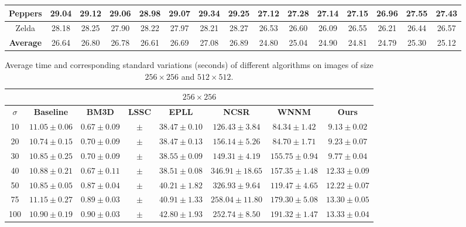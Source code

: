\documentclass[10pt,twocolumn,letterpaper]{article}
\begin{document}
\begin{table*}[t]
\begin{center}
\begin{tabular}{|c||c|c|c|c|c|c|c||c|c|c|c|c|c|c|}
\\
\hline
 Peppers &29.04 & 29.12 & 29.06 & 28.98 & 29.07 & 29.34 & 29.25      &27.12& 27.28 & 27.14 &  27.15 & 26.96 &  27.55  &  27.43
\\
\hline
 Zelda & 28.18 & 28.25 & 27.90 & 28.22 & 27.97 & 28.21 & 28.27      &26.53  &  26.60 & 26.09 &  26.55  & 26.21  & 26.44 & 26.57
\\
\hline
 \textbf{Average} & 26.64 &  26.80 &  26.78 &  26.61  & 26.69  & 27.08 & 26.89     &24.80 &  25.04 & 24.90  &  24.81 & 24.79 & 25.30 & 25.12     
\\
\hline
\end{tabular}
\end{center}
\end{table*}
\begin{table*}[t]\label{tab1}
\caption{Average time and corresponding standard variations (seconds) of  different algorithms on images of size $256\times 256$ and $512\times 512$.}
\begin{center}
\renewcommand\arraystretch{1}
\scriptsize
\begin{tabular}{|c||c|c|c|c|c|c|c|}
\hline
&\multicolumn{7}{c|}{ $256 \times 256$}
\\
\hline
\hline
$\sigma$&\textbf{Baseline} &\textbf{BM3D}&\textbf{LSSC}&\textbf{EPLL}&\textbf{NCSR}&\textbf{WNNM}&\textbf{Ours} 
\\
\hline
  10 &$11.05\pm0.06$  & $0.67\pm 0.09$  &   $  \pm $  & $38.47\pm0.10 $   & $126.43\pm3.84$   & $84.34\pm1.42$   &   $9.13\pm0.02$  
\\
\hline
  20 &$10.74\pm0.15$ &  $0.70\pm0.09$  & $  \pm $   & $38.47\pm0.13$   &  $156.14\pm5.26$  &  $84.70\pm1.71$  &  $9.23\pm 0.07$             
\\
\hline 
 30 &$10.85\pm0.25$   &  $0.70 \pm 0.09$  &  $  \pm $  & $38.55\pm0.09$  &  $149.31\pm4.19$  &  $155.75\pm0.94$  &  $9.77\pm0.04$            
\\
\hline
 40&$10.88\pm0.21$   &  $0.67\pm0.11$  &  $  \pm $  &  $38.51\pm0.08$  &  $346.91\pm18.65$  &  $157.35\pm1.48$  & $12.33\pm0.09$            
\\
\hline
 50&$10.85\pm0.05$   &  $0.87\pm0.04$  &  $  \pm $  &  $40.21\pm1.82 $  &  $326.93\pm9.64$  & $119.47\pm4.65$   &  $12.22\pm0.07$     
\\
\hline
 75 &$11.15\pm0.27$   & $0.89\pm0.03$ &  $  \pm $  &   $40.91\pm1.33$ &  $258.04\pm11.80$  & $ 179.30\pm5.08$   &   $13.30\pm0.05$  
\\
\hline
 100 &$10.90\pm0.19$  &  $0.90\pm0.03$  &  $  \pm $  &$42.80\pm 1.93$  & $252.74\pm8.50$   &  $191.32\pm 1.47$  &  $13.33\pm0.04$     

\end{tabular}
\end{center}
\end{table*}
\end{document}
